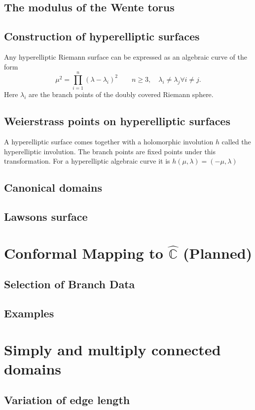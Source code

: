 \documentclass{book}
\begin{document}
\subsection{The modulus of the Wente torus}

\subsection{Construction of hyperelliptic surfaces}
Any hyperelliptic Riemann surface can be expressed as an algebraic curve of the form
\[ \mu^2 = \prod_{i=1}^n(\lambda-\lambda_i)^2 \quad\quad n\geq3,\quad \lambda_i\neq \lambda_j \forall i\neq j.\]
Here $\lambda_i$ are the branch points of the doubly covered Riemann sphere.

\subsection{Weierstrass points on hyperelliptic surfaces}
A hyperelliptic surface comes together with a holomorphic involution $h$ called the hyperelliptic involution. The branch points are fixed points under this transformation. For a hyperelliptic algebraic curve it is $h(\mu, \lambda)=(-\mu, \lambda)$

\subsection{Canonical domains}
\subsection{Lawsons surface}


\section{Conformal Mapping to $\hat{\mathbb{C}}$ (Planned)}
\subsection{Selection of Branch Data}
\subsection{Examples}

\section{Simply and multiply connected domains}
\label{sec:planar_domains}
\subsection{Variation of edge length}
\end{document}
